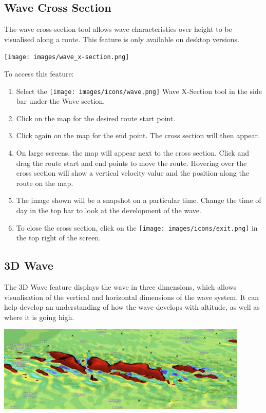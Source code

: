 \documentclass[11pt,a4paper]{article}
\begin{document}
\subsection{Wave Cross Section}
The wave cross-section tool allows wave characteristics over height to be visualised along a route. This feature is only available on desktop versions.
\begin{center}
\texttt{[image: images/wave\_x-section.png]}
\end{center}

To access this feature:
\begin{enumerate}
\item Select the \texttt{[image: images/icons/wave.png]} Wave X-Section tool in the side bar under the Wave section.
\item Click on the map for the desired route start point.
\item Click again on the map for the end point. The cross section will then appear.
\item On large screens, the map will appear next to the cross section. Click and drag the route start and end points to move the route. Hovering over the cross section will show a vertical velocity value and the position along the route on the map.
\item The image shown will be a snapshot on a particular time. Change the time of day in the top bar to look at the development of the wave.
\item To close the cross section, click on the \texttt{[image: images/icons/exit.png]} in the top right of the screen.
\end{enumerate}

\subsection{3D Wave}
The 3D Wave feature displays the wave in three dimensions, which allows visualisation of the vertical and horizontal dimensions of the wave system. It can help develop an understanding of how the wave develops with altitude, as well as where it is going high.

\begin{center}
\includegraphics[width=12cm]{images/3dwave.png}
\end{center}
\end{document}
